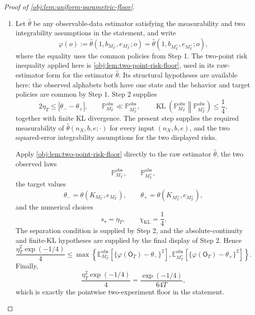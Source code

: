 \documentclass[11pt]{article}
\begin{document}
\begin{proof}[Proof of \cref{obj:lem:uniform-parametric-floor}]
\begin{enumerate}
action coordinates.  The observed laws in the statement are the pushforwards
\[
\mathbb P_{M_T^-}^{\mathrm{obs}}
=(\mathfrak d_T)_\#\Pi_{-,T}^{\mathrm{code}},
\qquad
\mathbb P_{M_T^+}^{\mathrm{obs}}
=(\mathfrak d_T)_\#\Pi_{+,T}^{\mathrm{code}}.
\]
KL divergence is monotone under measurable pushforward, so the preceding coded
product bound gives
\[
\operatorname{KL}\!\left(
\mathbb P_{M_T^-}^{\mathrm{obs}}
\middle\|
\mathbb P_{M_T^+}^{\mathrm{obs}}
\right)
\le
\operatorname{KL}(\Pi_{-,T}^{\mathrm{code}}\|
\Pi_{+,T}^{\mathrm{code}})
\le
\frac14.
\]
This is the observed KL budget in \cref{obj:lem:parametric-pair-observed-kl}.
The positive one-epoch masses give
\(\Pi_{-,T}^{\mathrm{code}}\ll\Pi_{+,T}^{\mathrm{code}}\), hence also
\(\mathbb P_{M_T^-}^{\mathrm{obs}}\ll\mathbb P_{M_T^+}^{\mathrm{obs}}\), and the
displayed upper bound gives finite KL divergence. %

\item Let \(\widehat\theta\) be any observable-data estimator satisfying the
measurability and two integrability assumptions in the statement, and write
\[
\varphi(o):=
\widehat\theta(1,b_{M_T^-},e_{M_T^-};o)
=
\widehat\theta(1,b_{M_T^+},e_{M_T^+};o),
\]
where the equality uses the common policies from Step 1.  The two-point risk
inequality applied here is \cref{obj:lem:two-point-risk-floor}, used in its
raw-estimator form for the estimator \(\widehat\theta\).  Its structural
hypotheses are available here: the observed alphabets both have one state and
the behavior and target policies are common by Step 1.  Step 2 supplies
\[
2\eta_T\le |\theta_- - \theta_+|,
\qquad
\mathbb P_{M_T^-}^{\mathrm{obs}}\ll
\mathbb P_{M_T^+}^{\mathrm{obs}},
\qquad
\operatorname{KL}\!\left(
\mathbb P_{M_T^-}^{\mathrm{obs}}
\middle\|
\mathbb P_{M_T^+}^{\mathrm{obs}}
\right)
\le \frac14,
\]
together with finite KL divergence.  The present step supplies the required
measurability of \(\widehat\theta(n_X,b,e;\cdot)\) for every input
\((n_X,b,e)\), and the two squared-error integrability assumptions for the two
displayed risks.

Apply \cref{obj:lem:two-point-risk-floor} directly to the raw estimator
\(\widehat\theta\), the two observed laws
\[
\mathbb P_{M_T^-}^{\mathrm{obs}},
\qquad
\mathbb P_{M_T^+}^{\mathrm{obs}},
\]
the target values
\[
\theta_-=
\theta(K_{M_T^-},e_{M_T^-}),
\qquad
\theta_+=
\theta(K_{M_T^+},e_{M_T^+}),
\]
and the numerical choices
\[
s_\star=\eta_T,
\qquad
\chi_{\mathrm{KL}}=\frac14.
\]
The separation condition is supplied by Step 2, and the absolute-continuity and
finite-KL hypotheses are supplied by the final display of Step 2.  Hence
\[
\frac{\eta_T^2\exp(-1/4)}{4}
\le
\max\left\{
\mathbb E_{M_T^-}^{\mathrm{obs}}
\!\left[
\{\varphi(\mathsf O_T)-\theta_-\}^2
\right],
\mathbb E_{M_T^+}^{\mathrm{obs}}
\!\left[
\{\varphi(\mathsf O_T)-\theta_+\}^2
\right]
\right\}.
\]
Finally,
\[
\frac{\eta_T^2\exp(-1/4)}{4}
=
\frac{\exp(-1/4)}{64T},
\]
which is exactly the pointwise two-experiment floor in the statement.


\end{enumerate}
\end{proof}
\end{document}
